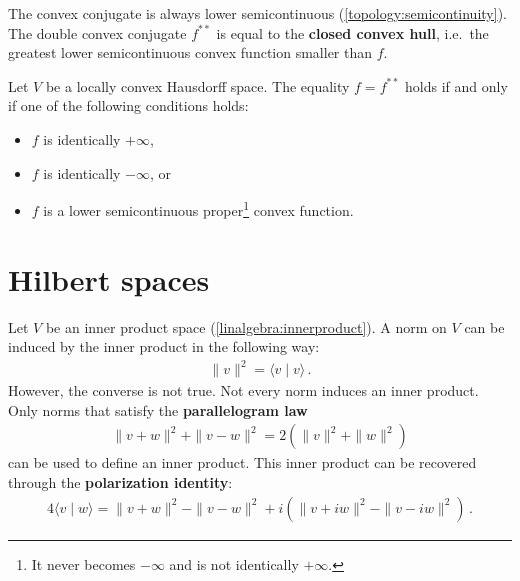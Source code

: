     \begin{property}
        The convex conjugate is always lower semicontinuous (\cref{topology:semicontinuity}). The double convex conjugate $f^{**}$ is equal to the \textbf{closed convex hull}, i.e.~the greatest lower semicontinuous convex function smaller than $f$.
    \end{property}

    \begin{theorem}
        Let $V$ be a locally convex Hausdorff space. The equality $f=f^{**}$ holds if and only if one of the following conditions holds:
        \begin{itemize}
            \item $f$ is identically $+\infty$,
            \item $f$ is identically $-\infty$, or
            \item $f$ is a lower semicontinuous proper\footnote{It never becomes $-\infty$ and is not identically $+\infty$.} convex function.
        \end{itemize}
    \end{theorem}

\section{Hilbert spaces}

    \begin{remark}
        Let $V$ be an inner product space (\cref{linalgebra:innerproduct}). A norm on $V$ can be induced by the inner product in the following way:
        \begin{gather}
            \label{functional:inner_product_norm}
            \|v\|^2 = \langle v\mid v \rangle\,.
        \end{gather}
        However, the converse is not true. Not every norm induces an inner product. Only norms that satisfy the \textbf{parallelogram law}
        \begin{gather}
            \label{functional:parallellogram_law}
            \|v+w\|^2 + \|v-w\|^2 = 2(\|v\|^2 + \|w\|^2)
        \end{gather}
        can be used to define an inner product. This inner product can be recovered through the \textbf{polarization identity}:
        \begin{gather}
            \label{functional:polarization_identity}
            4\langle v\mid w \rangle = \|v+w\|^2 - \|v-w\|^2 + i\left(\|v+iw\|^2 - \|v-iw\|^2\right)\,.
        \end{gather}
    \end{remark}

